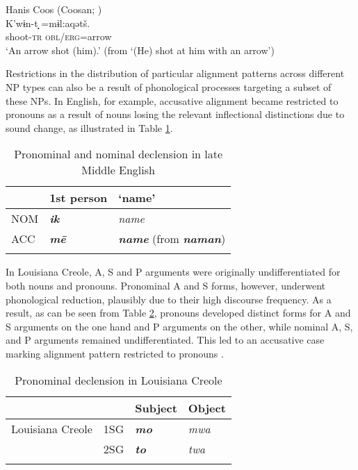 \documentclass[output=paper]{langsci/langscibook}
\begin{document}
\ea 
\label{hanis}
Hanis Coos (Coosan; )\\
\gll K'w​ɨn-t \textbf{̣}=m​ɨl:aqətš.\\
shoot-\textsc{tr} \textsc{obl/erg}=arrow\\
\glt `An arrow shot (him).' (from `(He) shot at him with an arrow')

\z

Restrictions in the distribution of particular
alignment patterns across different NP types can also be a result of
phonological processes targeting a subset of these
NPs. 
In English, for example, accusative alignment
  became restricted to pronouns as a result of nouns losing the
  relevant inflectional distinctions due to sound change, as illustrated in Table
  \ref{blake}. 



\begin{table}
  
    \begin{tabular}{lll}
    \lsptoprule
 &1st person&`name'\\
 \midrule
      NOM&\textbf{\textit{ik}} &{\em name}\\
      ACC &\textbf{\textit{mē}} &\textbf{\textit{name}} (from \textbf{\textit{naman}})\\
      \lspbottomrule
\end{tabular}
  
\caption{Pronominal and nominal declension in late Middle English \protect{} \label{blake}}
\end{table}

In Louisiana Creole, A, S and P arguments were originally
undifferentiated for both nouns and pronouns. Pronominal A and S forms,
however, underwent phonological reduction, plausibly due to their high discourse frequency. As a result, as can be seen from Table \ref{apics}, pronouns developed
 distinct forms for A and S
    arguments on the one hand and P arguments on the other, while nominal A, S, and P arguments
    remained undifferentiated. This led to an accusative case marking
    alignment pattern restricted to pronouns \citep{HaspelmathAPiCS}.
   

\begin{table}
  
\begin{tabular}{llll}
\lsptoprule
 & &Subject &Object\\
 \midrule
 Louisiana Creole &1SG &\textbf{\textit{mo}} &{\em mwa}\\
 &2SG &\textbf{\textit{to}} &{\em twa}\\
 \lspbottomrule
\end{tabular}
  
  \caption{Pronominal declension in Louisiana Creole \citep{HaspelmathAPiCS}}\label{apics}
  \end{table}
\end{document}
